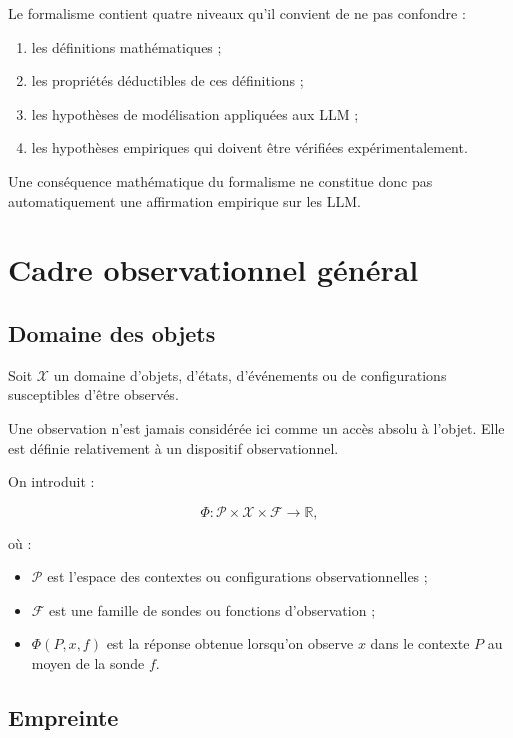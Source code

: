 \documentclass[11pt,a4paper]{article}
\newcommand{\X}{\mathcal X}
\newcommand{\R}{\mathbb R}
\newcommand{\F}{\mathcal F}
\begin{document}
Le formalisme contient quatre niveaux qu'il convient de ne pas confondre :

\begin{enumerate}[label=\arabic*.]
    \item les définitions mathématiques ;
    \item les propriétés déductibles de ces définitions ;
    \item les hypothèses de modélisation appliquées aux LLM ;
    \item les hypothèses empiriques qui doivent être vérifiées
    expérimentalement.
\end{enumerate}

Une conséquence mathématique du formalisme ne constitue donc pas
automatiquement une affirmation empirique sur les LLM.

\section{Cadre observationnel général}

\subsection{Domaine des objets}

Soit $\X$ un domaine d'objets, d'états, d'événements ou de configurations
susceptibles d'être observés.

Une observation n'est jamais considérée ici comme un accès absolu à l'objet.
Elle est définie relativement à un dispositif observationnel.

On introduit :

\[
\Phi :
\mathcal P \times \X \times \F
\longrightarrow
\R,
\]

où :

\begin{itemize}
    \item $\mathcal P$ est l'espace des contextes ou configurations
    observationnelles ;
    \item $\F$ est une famille de sondes ou fonctions d'observation ;
    \item $\Phi(P,x,f)$ est la réponse obtenue lorsqu'on observe $x$
    dans le contexte $P$ au moyen de la sonde $f$.
\end{itemize}

\subsection{Empreinte}
\end{document}
